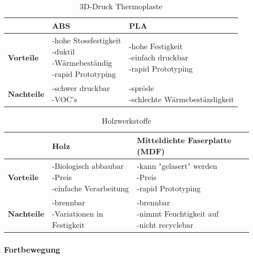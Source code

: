 \begin{table}[H]
\centering
\small
\begin{tabularx}{\textwidth}{|l|X|X|}
\hline
  \textbf{} & \textbf{ABS} & \textbf{PLA} \\
  \hline
  \textbf{Vorteile}  & \makecell{-hohe Stossfestigkeit\\ -duktil \\ -Wärmebeständig \\ -rapid Prototyping} & \makecell{-hohe Festigkeit \\-einfach druckbar\\ -rapid Prototyping}\\
  \hline
  \textbf{Nachteile} & \makecell{-schwer druckbar \\ -VOC's  \\} & \makecell{-spröde\\-schlechte Wärmebeständigkeit}\\
  \hline
\end{tabularx}
\caption{3D-Druck Thermoplaste}
\label{table:fdm-thermoplasts-comparison}
\end{table}


\begin{table}[H]
\centering
\small
\begin{tabularx}{\textwidth}{|l|X|X|}
\hline
  \textbf{} & \textbf{Holz} & \textbf{Mitteldichte Faserplatte (MDF)} \\
  \hline
  \textbf{Vorteile}  & \makecell{-Biologisch abbaubar\\ -Preis \\ -einfache Verarbeitung} & \makecell{-kann "gelasert"  werden \\-Preis\\ -rapid Prototyping}\\
  \hline
  \textbf{Nachteile} & \makecell{-brennbar \\ -Variationen in Festigkeit} & \makecell{-brennbar\\-nimmt Feuchtigkeit auf\\-nicht recyclebar}\\
  \hline
\end{tabularx}
\caption{Holzwerkstoffe}
\label{table:woods-comparison}
\end{table}

\newpage


\subsubsection{Fortbewegung}


